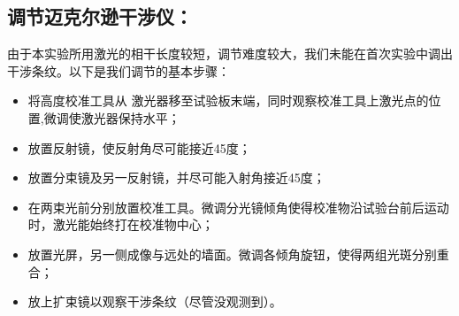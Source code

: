 \documentclass[10pt]{ctexart}
\begin{document}
\subsection{调节迈克尔逊干涉仪：}
由于本实验所用激光的相干长度较短，调节难度较大，我们未能在首次实验中调出干涉条纹。以下是我们调节的基本步骤：
\begin{itemize}
    \item 将高度校准工具从
    激光器移至试验板末端，同时观察校准工具上激光点的位置,微调使激光器保持水平；
    \item 放置反射镜，使反射角尽可能接近45度；
    \item 放置分束镜及另一反射镜，并尽可能入射角接近45度；
    \item 在两束光前分别放置校准工具。微调分光镜倾角使得校准物沿试验台前后运动时，激光能始终打在校准物中心；
    \item 放置光屏，另一侧成像与远处的墙面。微调各倾角旋钮，使得两组光斑分别重合；
    \item 放上扩束镜以观察干涉条纹（尽管没观测到）。
\end{itemize}
\end{document}

